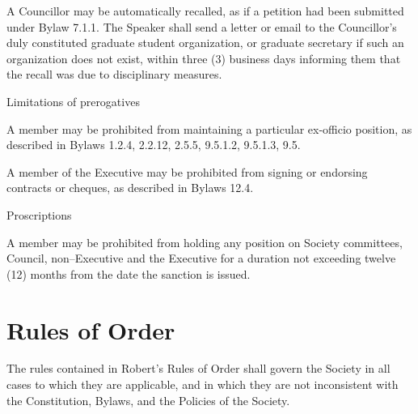 \begin{longenum}[ label*=\thesubsection.\arabic*., align=left]
\begin{longenum}[ label*=\arabic*., align=left]
        \item A Councillor may be automatically recalled, as if a petition had been submitted under Bylaw 7.1.1. The Speaker shall send a letter or email to the Councillor's duly constituted graduate student organization, or graduate secretary if such an organization does not exist, within three (3) business days informing them that the recall was due to disciplinary measures.
	\end{longenum}
    \item Limitations of prerogatives
    \begin{longenum}[ label*=\arabic*., align=left]
		\item A member may be prohibited from maintaining a particular ex-officio position, as described in Bylaws 1.2.4, 2.2.12, 2.5.5, 9.5.1.2, 9.5.1.3, 9.5.
        \item A member of the Executive may be prohibited from signing or endorsing contracts or cheques, as described in Bylaws 12.4.
	\end{longenum}
    \item Proscriptions
    \begin{longenum}[ label*=\arabic*., align=left]
		\item A member may be prohibited from holding any position on Society committees, Council, non--Executive and the Executive for a duration not exceeding twelve (12) months from the date the sanction is issued.
	\end{longenum}
\end{longenum}

\newpage

\section{Rules of Order}
\begin{longenum}[ label*=\thesection.\arabic*., align=left]
	\item The rules contained in Robert's Rules of Order shall govern the Society in all cases to which they are applicable, and in which they are not inconsistent with the Constitution, Bylaws, and the Policies of the Society.
\end{longenum}
\newpage

